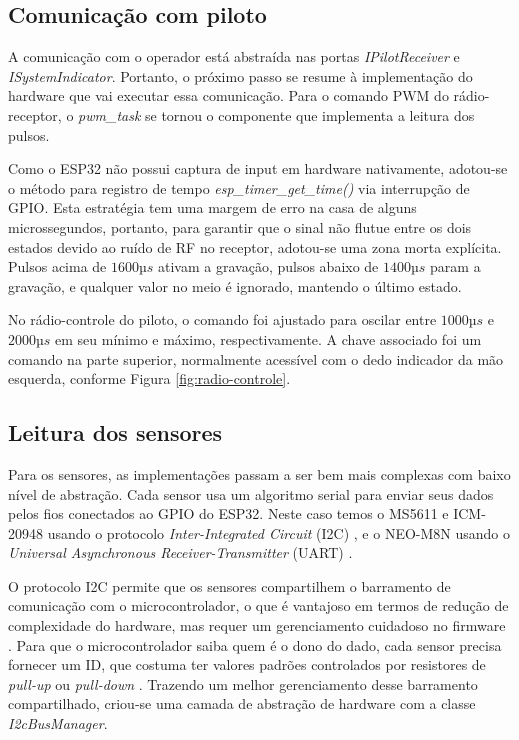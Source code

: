 \subsection{Comunicação com piloto}
A comunicação com o operador está abstraída nas portas \textit{IPilotReceiver} e \textit{ISystemIndicator}. Portanto, o próximo passo se resume à implementação do hardware que vai executar essa comunicação. Para o comando PWM do rádio-receptor, o \textit{pwm\_task} se tornou o componente que implementa a leitura dos pulsos.

Como o ESP32 não possui captura de input em hardware nativamente, adotou-se o método para registro de tempo \textit{esp\_timer\_get\_time()} via interrupção de GPIO. Esta estratégia tem uma margem de erro na casa de alguns microssegundos, portanto, para garantir que o sinal não flutue entre os dois estados devido ao ruído de RF no receptor, adotou-se uma zona morta explícita. Pulsos acima de $1600µs$ ativam a gravação, pulsos abaixo de $1400µs$ param a gravação, e qualquer valor no meio é ignorado, mantendo o último estado.

No rádio-controle do piloto, o comando foi ajustado para oscilar entre $1000µs$ e $2000µs$ em seu mínimo e máximo, respectivamente. A chave associado foi um comando na parte superior, normalmente acessível com o dedo indicador da mão esquerda, conforme Figura \ref{fig:radio-controle}.


\subsection{Leitura dos sensores}
Para os sensores, as implementações passam a ser bem mais complexas com baixo nível de abstração. Cada sensor usa um algoritmo serial para enviar seus dados pelos fios conectados ao GPIO do ESP32. Neste caso temos o MS5611 e ICM-20948 usando o protocolo \textit{Inter-Integrated Circuit} (I2C) \cite{MS5611_datasheet} \cite{ICM-20948_datasheet}, e o NEO-M8N usando o \textit{Universal Asynchronous Receiver-Transmitter} (UART) \cite{NEO-8M_datasheet}.

O protocolo I2C permite que os sensores compartilhem o barramento de comunicação com o microcontrolador, o que é vantajoso em termos de redução de complexidade do hardware, mas requer um gerenciamento cuidadoso no firmware \cite{the_art_of_electronics}. Para que o microcontrolador saiba quem é o dono do dado, cada sensor precisa fornecer um ID, que costuma ter valores padrões controlados por resistores de \textit{pull-up} ou \textit{pull-down} \cite{ICM-20948_datasheet}. Trazendo um melhor gerenciamento desse barramento compartilhado, criou-se uma camada de abstração de hardware com a classe \textit{I2cBusManager}.

